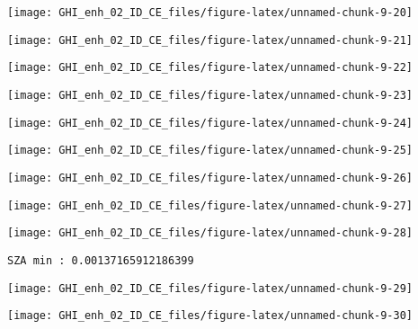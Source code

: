 \documentclass[
  10pt,
  a4paper,oneside]{article}
\begin{document}
\begin{center}\texttt{[image: GHI\_enh\_02\_ID\_CE\_files/figure-latex/unnamed-chunk-9-20]} \end{center}

\begin{center}\texttt{[image: GHI\_enh\_02\_ID\_CE\_files/figure-latex/unnamed-chunk-9-21]} \end{center}

\begin{center}\texttt{[image: GHI\_enh\_02\_ID\_CE\_files/figure-latex/unnamed-chunk-9-22]} \end{center}

\begin{center}\texttt{[image: GHI\_enh\_02\_ID\_CE\_files/figure-latex/unnamed-chunk-9-23]} \end{center}

\begin{center}\texttt{[image: GHI\_enh\_02\_ID\_CE\_files/figure-latex/unnamed-chunk-9-24]} \end{center}

\begin{center}\texttt{[image: GHI\_enh\_02\_ID\_CE\_files/figure-latex/unnamed-chunk-9-25]} \end{center}

\begin{center}\texttt{[image: GHI\_enh\_02\_ID\_CE\_files/figure-latex/unnamed-chunk-9-26]} \end{center}

\begin{center}\texttt{[image: GHI\_enh\_02\_ID\_CE\_files/figure-latex/unnamed-chunk-9-27]} \end{center}

\begin{center}\texttt{[image: GHI\_enh\_02\_ID\_CE\_files/figure-latex/unnamed-chunk-9-28]} \end{center}

\begin{verbatim}
SZA min : 0.00137165912186399 
\end{verbatim}

\begin{center}\texttt{[image: GHI\_enh\_02\_ID\_CE\_files/figure-latex/unnamed-chunk-9-29]} \end{center}

\begin{center}\texttt{[image: GHI\_enh\_02\_ID\_CE\_files/figure-latex/unnamed-chunk-9-30]} \end{center}
\end{document}
